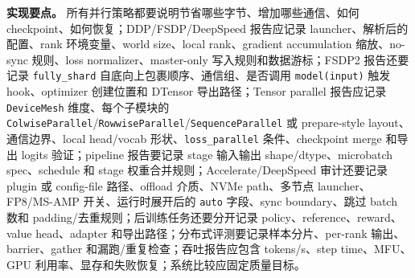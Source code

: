 \documentclass[UTF8,zihao=-4,openany]{ctexbook}
\begin{document}
\textbf{实现要点。} 所有并行策略都要说明节省哪些字节、增加哪些通信、如何 checkpoint、如何恢复；DDP/FSDP/DeepSpeed 报告应记录 launcher、解析后的配置、rank 环境变量、world size、local rank、gradient accumulation 缩放、no-sync 规则、loss normalizer、master-only 写入规则和数据游标；FSDP2 报告还要记录 \texttt{fully\_shard} 自底向上包裹顺序、通信组、是否调用 \texttt{model(input)} 触发 hook、optimizer 创建位置和 DTensor 导出路径；Tensor parallel 报告应记录 \texttt{DeviceMesh} 维度、每个子模块的 \texttt{ColwiseParallel}/\texttt{RowwiseParallel}/\texttt{SequenceParallel} 或 prepare-style layout、通信边界、local head/vocab 形状、\texttt{loss\_parallel} 条件、checkpoint merge 和导出 logits 验证；pipeline 报告要记录 stage 输入输出 shape/dtype、microbatch spec、schedule 和 stage 权重合并规则；Accelerate/DeepSpeed 审计还要记录 plugin 或 config-file 路径、offload 介质、NVMe path、多节点 launcher、FP8/MS-AMP 开关、运行时展开后的 \texttt{auto} 字段、sync boundary、跳过 batch 数和 padding/去重规则；后训练任务还要分开记录 policy、reference、reward、value head、adapter 和导出路径；分布式评测要记录样本分片、per-rank 输出、barrier、gather 和漏跑/重复检查；吞吐报告应包含 tokens/s、step time、MFU、GPU 利用率、显存和失败恢复；系统比较应固定质量目标。
\end{document}
